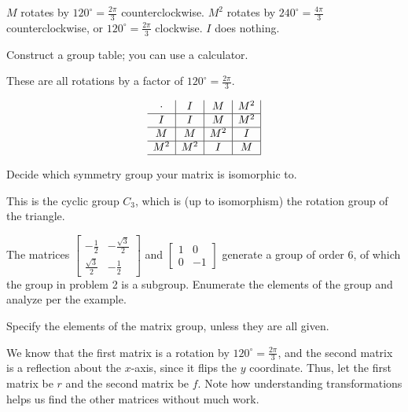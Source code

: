 \documentclass[../key.tex]{subfiles}
\begin{document}
$M$ rotates by $120^\circ=\frac{2\pi}{3}$ counterclockwise. $M^2$ rotates by $240^\circ=\frac{4\pi}{3}$ counterclockwise, or $120^\circ=\frac{2\pi}{3}$ clockwise. $I$ does nothing.

\begin{iinner_problem}
\item Construct a group table; you can use a calculator.
\end{iinner_problem}

These are all rotations by a factor of $120^\circ=\frac{2\pi}{3}$.

$$\begin{array}{c|c|c|c|}
\cdot & I & M & M^2 \\ \hline
I & I & M & M^2 \\ \hline
M & M & M^2 & I \\ \hline
M^2 & M^2 & I & M \\ \hline
\end{array}$$

\begin{iinner_problem}
\item Decide which symmetry group your matrix is isomorphic to.
\end{iinner_problem}

This is the cyclic group $C_3$, which is (up to isomorphism) the rotation group of the triangle.

\begin{outer_problem}
\item The matrices $\left[\begin{array}{cc} -\frac{1}{2} & -\frac{\sqrt{3}}{2} \\ \frac{\sqrt{3}}{2} & -\frac{1}{2}\end{array}\right]$ and $\left[\begin{array}{cc} 1 & 0 \\ 0 & -1 \end{array}\right]$ generate a group of order $6$, of which the group in problem 2 is a subgroup. Enumerate the elements of the group and analyze per the example.
\end{outer_problem}

\begin{iinner_problem}[start=1]
\item Specify the elements of the matrix group, unless they are all given.
\end{iinner_problem}

We know that the first matrix is a rotation by $120^\circ = \frac{2\pi}{3}$, and the second matrix is a reflection about the $x$-axis, since it flips the $y$ coordinate. Thus, let the first matrix be $r$ and the second matrix be $f$. Note how understanding transformations helps us find the other matrices without much work.
\end{document}
